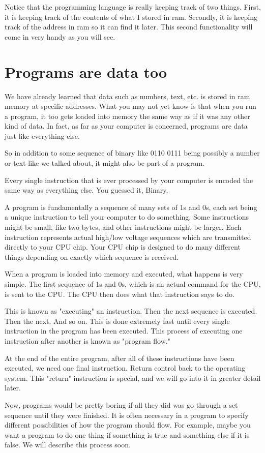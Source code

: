 \documentclass[a4paper,12pt]{article}
\let\stdsection\section
\renewcommand\section{\newpage\stdsection}
\begin{document}
Notice that the programming language is really keeping track of two things. First, it is keeping track of the contents of what I stored in ram. Secondly, it is keeping track of the address in ram so it can find it later. This second functionality will come in very handy as you will see.
\section{ Programs are data too}
We have already learned that data such as numbers, text, etc. is stored in ram memory at specific addresses. What you may not yet know is that when you run a program, it too gets loaded into memory the same way as if it was any other kind of data. In fact, as far as your computer is concerned, programs are data just like everything else.

So in addition to some sequence of binary like 0110 0111 being possibly a number or text like we talked about, it might also be part of a program.

Every single instruction that is ever processed by your computer is encoded the same way as everything else. You guessed it, Binary.

A program is fundamentally a sequence of many sets of 1s and 0s, each set being a unique instruction to tell your computer to do something. Some instructions might be small, like two bytes, and other instructions might be larger. Each instruction represents actual high/low voltage sequences which are transmitted directly to your CPU chip. Your CPU chip is designed to do many different things depending on exactly which sequence is received.

When a program is loaded into memory and executed, what happens is very simple. The first sequence of 1s and 0s, which is an actual command for the CPU, is sent to the CPU. The CPU then does what that instruction says to do.

This is known as "executing" an instruction. Then the next sequence is executed. Then the next. And so on. This is done extremely fast until every single instruction in the program has been executed. This process of executing one instruction after another is known as "program flow."

At the end of the entire program, after all of these instructions have been executed, we need one final instruction. Return control back to the operating system. This "return" instruction is special, and we will go into it in greater detail later.

Now, programs would be pretty boring if all they did was go through a set sequence until they were finished. It is often necessary in a program to specify different possibilities of how the program should flow. For example, maybe you want a program to do one thing if something is true and something else if it is false. We will describe this process soon.
\end{document}
